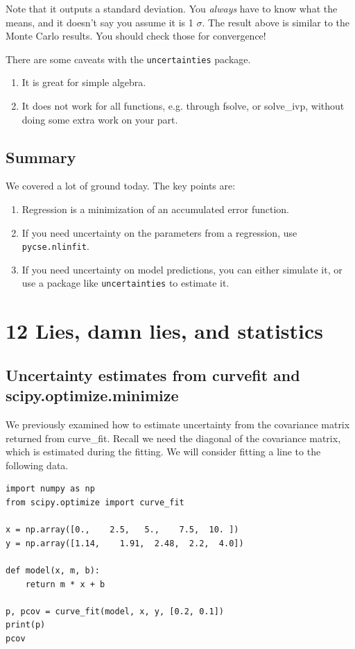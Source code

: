 \documentclass[11pt]{article}
\begin{document}
Note that it outputs \textpm{} a standard deviation. You \emph{always} have to know what the \textpm{} means, and it doesn't say you assume it is \textpm{} 1 \(\sigma\). The result above is similar to the Monte Carlo results. You should check those for convergence!

There are some caveats with the \texttt{uncertainties} package.
\begin{enumerate}
\item It is great for simple algebra.
\item It does not work for all functions, e.g. through fsolve, or solve\_ivp, without doing some extra work on your part.
\end{enumerate}

\subsection{Summary}
\label{sec:org0a7a298}

We covered a lot of ground today. The key points are:
\begin{enumerate}
\item Regression is a minimization of an accumulated error function.
\item If you need uncertainty on the parameters from a regression, use \texttt{pycse.nlinfit}.
\item If you need uncertainty on model predictions, you can either simulate it, or use a package like \texttt{uncertainties} to estimate it.
\end{enumerate}

\section{12 Lies, damn lies, and statistics}
\label{sec:org521d8a1}

\subsection{Uncertainty estimates from curvefit and scipy.optimize.minimize}
\label{sec:orge81586f}

We previously examined how to estimate uncertainty from the covariance matrix returned from curve\_fit. Recall we need the diagonal of the covariance matrix, which is estimated during the fitting. We will consider fitting a line to the following data.

\begin{verbatim}
import numpy as np
from scipy.optimize import curve_fit

x = np.array([0.,    2.5,   5.,    7.5,  10. ])
y = np.array([1.14,    1.91,  2.48,  2.2,  4.0])

def model(x, m, b):
    return m * x + b

p, pcov = curve_fit(model, x, y, [0.2, 0.1])
print(p)
pcov
\end{verbatim}
\end{document}
